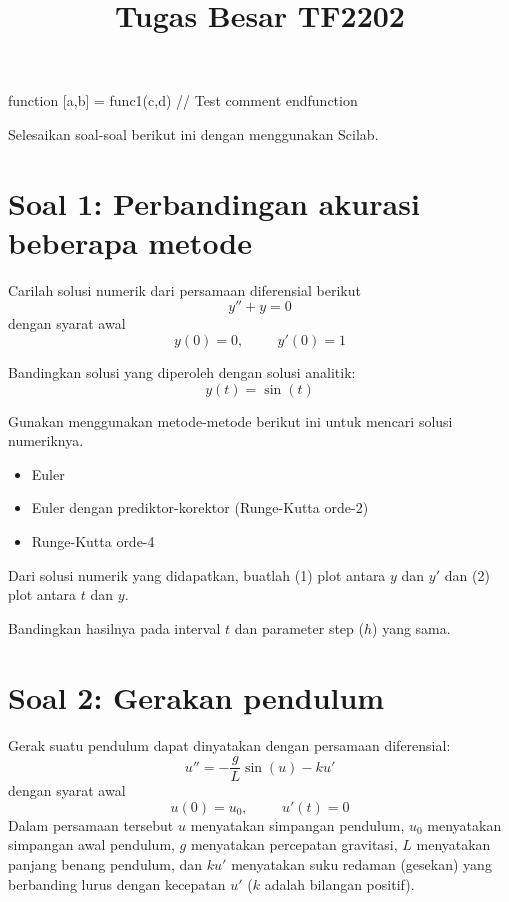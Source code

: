 \documentclass[12pt]{article}
\begin{document}
\title{Tugas Besar TF2202}
\date{}
\maketitle

\begin{scilabcode}
function [a,b] = func1(c,d)
  // Test comment
endfunction
\end{scilabcode}

Selesaikan soal-soal berikut ini dengan menggunakan Scilab.

\section{Soal 1: Perbandingan akurasi beberapa metode}

Carilah solusi numerik dari persamaan diferensial berikut
\begin{equation}
y'' + y = 0
\end{equation}
dengan syarat awal
\begin{equation}
y(0) = 0, \hspace{1cm} y'(0) = 1
\end{equation}

Bandingkan solusi yang diperoleh dengan solusi analitik:
\begin{equation}
y(t) = \sin(t)
\end{equation}

Gunakan menggunakan metode-metode berikut ini untuk mencari solusi numeriknya.
\begin{itemize}
\item Euler
\item Euler dengan prediktor-korektor (Runge-Kutta orde-2)
\item Runge-Kutta orde-4
\end{itemize}

Dari solusi numerik yang didapatkan, buatlah (1) plot antara $y$ dan $y'$
dan (2) plot antara $t$ dan $y$.

Bandingkan hasilnya pada interval $t$ dan parameter step ($h$) yang sama.

\section{Soal 2: Gerakan pendulum}

Gerak suatu pendulum dapat dinyatakan dengan persamaan diferensial:
\begin{equation}
u'' = -\frac{g}{L}\sin(u) - ku'
\end{equation}
dengan syarat awal
\begin{equation}
u(0) = u_0, \hspace{1cm} u'(t) = 0
\end{equation}
Dalam persamaan tersebut $u$ menyatakan simpangan pendulum,
$u_0$ menyatakan simpangan awal pendulum,
$g$ menyatakan percepatan gravitasi, $L$ menyatakan panjang benang pendulum,
dan $ku'$ menyatakan suku redaman (gesekan) yang berbanding lurus
dengan kecepatan $u'$ ($k$ adalah bilangan positif).
\end{document}
